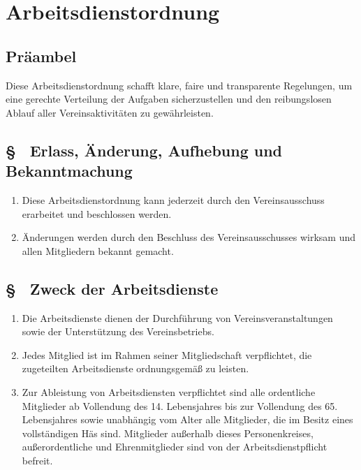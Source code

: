\setcounter{aoparagraphcounter}{1}

\section{Arbeitsdienstordnung}

\subsection{Präambel}
Diese Arbeitsdienstordnung schafft klare, faire und transparente Regelungen, um eine gerechte Verteilung der Aufgaben sicherzustellen und den reibungslosen Ablauf aller Vereinsaktivitäten zu gewährleisten.

\subsection{§ \theaoparagraphcounter\ Erlass, Änderung, Aufhebung und Bekanntmachung} \label{ao:par:erlass_aenderung_aufhebung}
\begin{enumerate}
    \item \label{ao:abs:vqebz2} Diese Arbeitsdienstordnung kann jederzeit durch den Vereinsausschuss erarbeitet und beschlossen werden.

    \item \label{ao:abs:lwq0s2} Änderungen werden durch den Beschluss des Vereinsausschusses wirksam und allen Mitgliedern bekannt gemacht.
\end{enumerate}

\subsection{§ \theaoparagraphcounter\ Zweck der Arbeitsdienste} \label{ao:par:zweck_arbeitsdienste}
\begin{enumerate}
    \item \label{ao:abs:ydf4si} Die Arbeitsdienste dienen der Durchführung von Vereinsveranstaltungen sowie der Unterstützung des Vereinsbetriebs.

    \item \label{ao:abs:jtkboo} Jedes Mitglied ist im Rahmen seiner Mitgliedschaft verpflichtet, die zugeteilten Arbeitsdienste ordnungsgemäß zu leisten.

    \item \label{ao:abs:rwc7yw} Zur Ableistung von Arbeitsdiensten verpflichtet sind alle ordentliche Mitglieder ab Vollendung des 14. Lebensjahres bis zur Vollendung des 65. Lebensjahres sowie unabhängig vom Alter alle Mitglieder, die im Besitz eines vollständigen Häs sind. Mitglieder außerhalb dieses Personenkreises, außerordentliche und Ehrenmitglieder sind von der Arbeitsdienstpflicht befreit.
\end{enumerate}

